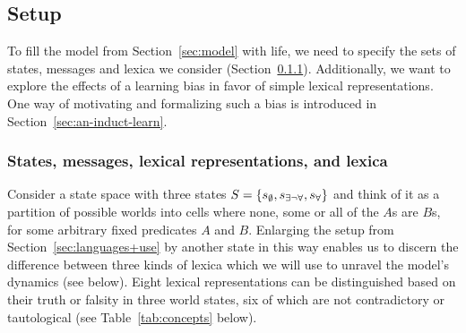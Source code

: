 \documentclass[a4paper, 11pt]{article}
\theoremstyle{Satz}
\newcommand{\set}[1]{\left\{#1\right\}}
\newcommand{\States}{\ensuremath{S}\xspace}		%
\newcommand{\state}{\ensuremath{s}\xspace}		%
\newcommand{\mystate}[1]{\ensuremath{\state_{\text{#1}}}\xspace} %
\newcommand{\ssome}{\mystate{\ensuremath{\exists\neg\forall}}}
\newcommand{\sall}{\mystate{\ensuremath{\forall}}}
\newcommand{\snone}{\mystate{\ensuremath{\emptyset}}}
\begin{document}
\subsection{Setup}
\label{sec:setup:-stat-conc}

To fill the model from Section~\ref{sec:model} with life, we need to specify the sets of
states, messages and lexica we consider (Section~\ref{sec:stat-mess-conc}). Additionally, we want to
explore the effects of a learning bias in favor of simple lexical representations. One way of
motivating and formalizing such a bias is introduced in Section~\ref{sec:an-induct-learn}.


\subsubsection{States, messages, lexical representations, and lexica} 
\label{sec:stat-mess-conc}


Consider a state space with three states $\States = \set{\snone, \ssome, \sall}$ and think of
it as a partition of possible worlds into cells where none, some or all of the $A$s are $B$s,
for some arbitrary fixed predicates $A$ and $B$. Enlarging the setup from Section~\ref{sec:languages+use} by another state in this way enables us to discern the difference between three kinds of lexica which we will use to unravel the model's dynamics (see below). Eight lexical representations can be distinguished based on their truth or falsity in three world states, six of which are not contradictory or tautological (see Table~\ref{tab:concepts} below).
\end{document}
